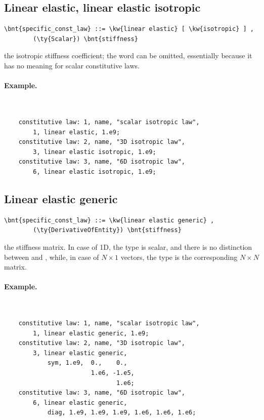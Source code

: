 \subsection{Linear elastic, linear elastic isotropic}
\begin{Verbatim}[commandchars=\\\{\}]
    \bnt{specific_const_law} ::= \kw{linear elastic} [ \kw{isotropic} ] , 
        (\ty{Scalar}) \bnt{stiffness}
\end{Verbatim}
the isotropic stiffness coefficient; the word 
can be omitted, essentially because it has no meaning
for scalar constitutive laws.

\paragraph{Example.} \
\begin{verbatim}
    constitutive law: 1, name, "scalar isotropic law",
        1, linear elastic, 1.e9;
    constitutive law: 2, name, "3D isotropic law",
        3, linear elastic isotropic, 1.e9;
    constitutive law: 3, name, "6D isotropic law",
        6, linear elastic isotropic, 1.e9;
\end{verbatim}
  
  
\subsection{Linear elastic generic}
\begin{Verbatim}[commandchars=\\\{\}]
    \bnt{specific_const_law} ::= \kw{linear elastic generic} ,
        (\ty{DerivativeOfEntity}) \bnt{stiffness}
\end{Verbatim}
the stiffness matrix. In case of 1D, the type is scalar, 
and there is no distinction between  and , 
while, in case of $N \times 1$ vectors, the type is the corresponding 
$N \times N$ matrix.

\paragraph{Example.} \
\begin{verbatim}
    constitutive law: 1, name, "scalar isotropic law",
        1, linear elastic generic, 1.e9;
    constitutive law: 2, name, "3D isotropic law",
        3, linear elastic generic,
            sym, 1.e9,  0.,    0.,
                        1.e6, -1.e5,
                               1.e6;
    constitutive law: 3, name, "6D isotropic law",
        6, linear elastic generic,
            diag, 1.e9, 1.e9, 1.e9, 1.e6, 1.e6, 1.e6;
\end{verbatim}
  

